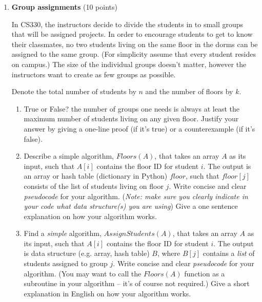 \documentclass[11pt]{article}
\begin{document}
\begin{enumerate}
\begin{enumerate}
\begin{enumerate}
    \end{enumerate}
    
 

 
    \end{enumerate}


\item \textbf{Group assignments} (10 points)



In CS330, the instructors decide to divide the students in to small groups that will be assigned projects. In order to encourage students to get to know their classmates,  no two students living on the same floor in the dorms can be assigned to the same group. (For simplicity assume that every student resides on campus.)  The size of the individual groups doesn't matter, however the instructors want to create as few groups as possible. 

Denote the total number of students by $n$ and the number of floors by $k$.


\begin{enumerate}
\item 
 True or False? the number of groups one needs is
always at least the maximum number of  students living on any given
floor. Justify your answer by giving a one-line proof (if it's true) or
a counterexample (if it's false).

\item Describe a simple algorithm, $Floors(A)$,
that takes an array $A$ as its input, such that $A[i]$ contains  the floor ID for  student $i$. The output is an array or hash table (dictionary in Python)  $floor$, such that $floor[j]$ consists of the list of students living on floor $j$.  Write concise and clear \emph{pseudocode} for your algorithm. (\emph{Note: make sure you clearly indicate in your code what data structure(s) you are using}) Give a one sentence explanation on how your algorithm works.

\item Find a \emph{simple} algorithm, $AssignStudents(A )$, that takes an array $A$ as its input, such that $A[i]$ contains  the floor ID for  student $i$. The output is data structure (e.g. array, hash table)  $B$, where $B[j]$ contains a \emph{list} of students assigned to group $j$.  Write concise and clear \emph{pseudocode} for your algorithm. (You may want to call the $Floors(A)$ function as a subroutine in your algorithm -- it's of course not required.) Give a short explanation in English on how your algorithm works.\\
 

\end{enumerate}
\end{enumerate}
\end{document}
